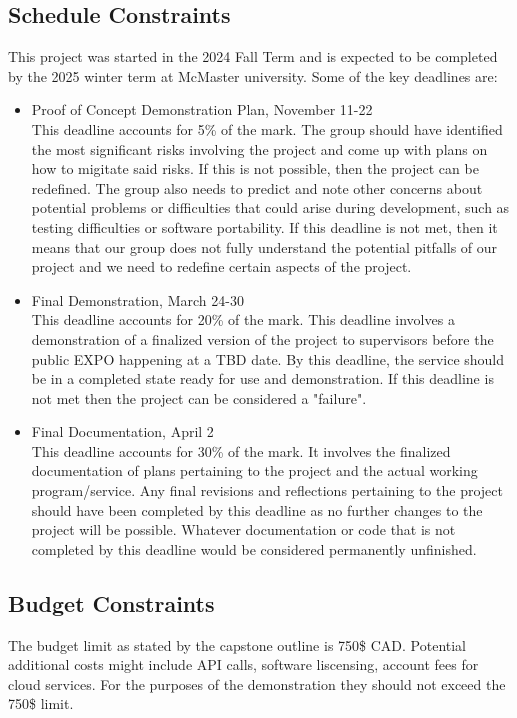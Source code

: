 \documentclass[12pt]{article}
\begin{document}
\subsection{Schedule Constraints}
This project was started in the 2024 Fall Term and is expected to be completed by the 
2025 winter term at McMaster university. Some of the key deadlines are: 
\begin{itemize}
  \item Proof of Concept Demonstration Plan, November 11-22
  \\This deadline accounts for 5\% of the mark. The group should have identified the most significant
  risks involving the project and come up with plans on how to migitate said risks. If this is not possible, then the project 
  can be redefined. The group also needs to predict and note other concerns about potential problems or difficulties that could arise
  during development, such as testing difficulties or software portability. If this deadline is not met, then it means that our group
   does not fully understand the potential pitfalls of our project and we need to redefine certain aspects of the project. 

  \item Final Demonstration, March 24-30
  \\This deadline accounts for 20\% of the mark. This deadline involves a demonstration of a finalized 
  version of the project to supervisors before the public EXPO happening at a TBD date. By this deadline, 
  the service should be in a completed state ready for use and demonstration. If this deadline is not met then
  the project can be considered a "failure". 

  \item Final Documentation, April 2
  \\This deadline accounts for 30\% of the mark. It involves the finalized documentation of plans pertaining to 
  the project and the actual working program/service. Any final revisions and reflections pertaining to the project
  should have been completed by this deadline as no further changes to the project will be possible. Whatever documentation
  or code that is not completed by this deadline would be considered permanently unfinished. 
\end{itemize}

\subsection{Budget Constraints}
The budget limit as stated by the capstone outline is 750\$ CAD. Potential additional
costs might include API calls, software liscensing, account fees for cloud services. 
For the purposes of the demonstration they should not exceed the 750\$ limit. 
\end{document}
